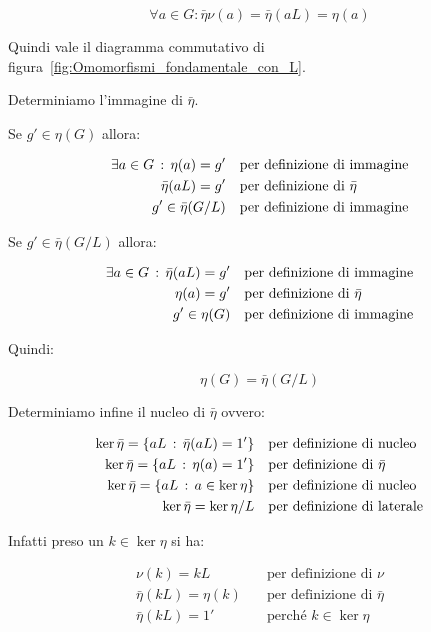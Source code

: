 \begin{dimostrazione}
	\begin{equation}
		\forall a \in G : \bar{\eta}\nu(a) = \bar{\eta}(aL) = \eta(a)
	\end{equation}

	Quindi vale il diagramma commutativo di figura~\ref{fig:Omomorfismi_fondamentale_con_L}.

	Determiniamo l'immagine di $\bar{\eta}$.
	
	Se $g' \in \eta(G)$ allora:
	
	\begin{align}
		\exists a \in G \,:\, \eta(a) = g' &\quad\text{per definizione di immagine} \\
		\bar{\eta}(aL) = g' &\quad\text{per definizione di $\bar{\eta}$} \\
		g' \in \bar{\eta}(G/L) &\quad\text{per definizione di immagine}
	\end{align}

	Se $g' \in \bar{\eta}(G/L)$ allora:

	\begin{align}
		\exists a \in G \,:\, \bar{\eta}(aL) = g' &\quad\text{per definizione di immagine} \\
		\eta(a) = g' &\quad\text{per definizione di $\bar{\eta}$} \\
		g' \in \eta(G) &\quad\text{per definizione di immagine}
	\end{align}

	Quindi:
	
	\begin{equation}
		\eta(G) = \bar{\eta}(G/L)
	\end{equation}
	
	Determiniamo infine il nucleo di $\bar{\eta}$ ovvero:
	
	\begin{align}
		\ker \bar{\eta} = \{aL \,:\, \bar{\eta}(aL) = 1'\} & \quad\text{per definizione di nucleo} \\
		\ker \bar{\eta} = \{aL \,:\, \eta(a) = 1'\} & \quad\text{per definizione di $\bar{\eta}$} \\
		\ker \bar{\eta} = \{aL \,:\, a \in \ker \eta\} & \quad\text{per definizione di nucleo} \\
		\label{eqn:nucleo_eta_segnato} \ker \bar{\eta} = \ker \eta / L &\quad\text{per definizione di laterale}
	\end{align}

	Infatti preso un $k \in \ker \eta$ si ha:
	
	\begin{align}
		\nu(k) = kL &\quad\text{per definizione di $\nu$} \\
		\bar{\eta}(kL) = \eta(k) & \quad\text{per definizione di $\bar{\eta}$} \\
		\bar{\eta}(kL) = 1' &\quad\text{perché $k \in \ker \eta$}
	\end{align}
	

\end{dimostrazione}
